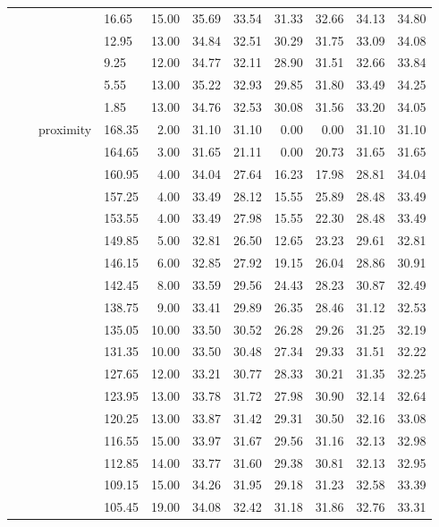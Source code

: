 \begin{longtable}{llllrrrrrrr}
   &  &  & 16.65 & 15.00 & 35.69 & 33.54 & 31.33 & 32.66 & 34.13 & 34.80 \\ 
   &  &  & 12.95 & 13.00 & 34.84 & 32.51 & 30.29 & 31.75 & 33.09 & 34.08 \\ 
   &  &  & 9.25 & 12.00 & 34.77 & 32.11 & 28.90 & 31.51 & 32.66 & 33.84 \\ 
   &  &  & 5.55 & 13.00 & 35.22 & 32.93 & 29.85 & 31.80 & 33.49 & 34.25 \\ 
   &  &  & 1.85 & 13.00 & 34.76 & 32.53 & 30.08 & 31.56 & 33.20 & 34.05 \\ 
   &  & proximity & 168.35 & 2.00 & 31.10 & 31.10 & 0.00 & 0.00 & 31.10 & 31.10 \\ 
   &  &  & 164.65 & 3.00 & 31.65 & 21.11 & 0.00 & 20.73 & 31.65 & 31.65 \\ 
   &  &  & 160.95 & 4.00 & 34.04 & 27.64 & 16.23 & 17.98 & 28.81 & 34.04 \\ 
   &  &  & 157.25 & 4.00 & 33.49 & 28.12 & 15.55 & 25.89 & 28.48 & 33.49 \\ 
   &  &  & 153.55 & 4.00 & 33.49 & 27.98 & 15.55 & 22.30 & 28.48 & 33.49 \\ 
   &  &  & 149.85 & 5.00 & 32.81 & 26.50 & 12.65 & 23.23 & 29.61 & 32.81 \\ 
   &  &  & 146.15 & 6.00 & 32.85 & 27.92 & 19.15 & 26.04 & 28.86 & 30.91 \\ 
   &  &  & 142.45 & 8.00 & 33.59 & 29.56 & 24.43 & 28.23 & 30.87 & 32.49 \\ 
   &  &  & 138.75 & 9.00 & 33.41 & 29.89 & 26.35 & 28.46 & 31.12 & 32.53 \\ 
   &  &  & 135.05 & 10.00 & 33.50 & 30.52 & 26.28 & 29.26 & 31.25 & 32.19 \\ 
   &  &  & 131.35 & 10.00 & 33.50 & 30.48 & 27.34 & 29.33 & 31.51 & 32.22 \\ 
   &  &  & 127.65 & 12.00 & 33.21 & 30.77 & 28.33 & 30.21 & 31.35 & 32.25 \\ 
   &  &  & 123.95 & 13.00 & 33.78 & 31.72 & 27.98 & 30.90 & 32.14 & 32.64 \\ 
   &  &  & 120.25 & 13.00 & 33.87 & 31.42 & 29.31 & 30.50 & 32.16 & 33.08 \\ 
   &  &  & 116.55 & 15.00 & 33.97 & 31.67 & 29.56 & 31.16 & 32.13 & 32.98 \\ 
   &  &  & 112.85 & 14.00 & 33.77 & 31.60 & 29.38 & 30.81 & 32.13 & 32.95 \\ 
   &  &  & 109.15 & 15.00 & 34.26 & 31.95 & 29.18 & 31.23 & 32.58 & 33.39 \\ 
   &  &  & 105.45 & 19.00 & 34.08 & 32.42 & 31.18 & 31.86 & 32.76 & 33.31 \\ 

\end{longtable}

